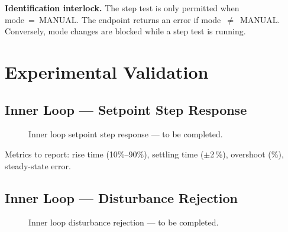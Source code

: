 \textbf{Identification interlock.} The step test is only permitted when mode~=~MANUAL.
The  endpoint returns an error if mode~$\neq$~MANUAL.
Conversely, mode changes are blocked while a step test is running.

\section{Experimental Validation}


\subsection{Inner Loop --- Setpoint Step Response}

\begin{figure}[H]
  \centering
  \caption{Inner loop setpoint step response --- to be completed.}
  \label{fig:inner_step}
\end{figure}

Metrics to report: rise time (10\%--90\%), settling time ($\pm$2\,\%), overshoot (\%),
steady-state error.

\subsection{Inner Loop --- Disturbance Rejection}

\begin{figure}[H]
  \centering
  \caption{Inner loop disturbance rejection --- to be completed.}
  \label{fig:inner_dist}
\end{figure}

